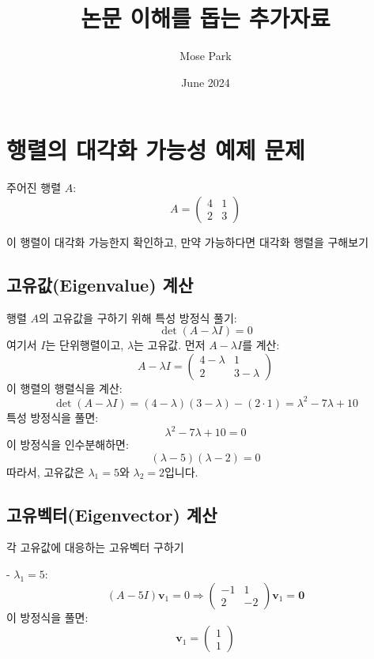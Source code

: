 \documentclass{article}
\title{논문 이해를 돕는 추가자료}
\author{Mose Park}
\date{June 2024}
\begin{document}
\maketitle

\section{행렬의 대각화 가능성 예제 문제}

주어진 행렬 \(A\):
\[
A = \begin{pmatrix}
4 & 1 \\
2 & 3
\end{pmatrix}
\]

이 행렬이 대각화 가능한지 확인하고, 만약 가능하다면 대각화 행렬을 구해보기

\subsection{고유값(Eigenvalue) 계산}


   행렬 \(A\)의 고유값을 구하기 위해 특성 방정식 풀기:
   \[
   \det(A - \lambda I) = 0
   \]
   여기서 \(I\)는 단위행렬이고, \(\lambda\)는 고유값. 먼저 \(A - \lambda I\)를 계산:
   \[
   A - \lambda I = \begin{pmatrix}
   4 - \lambda & 1 \\
   2 & 3 - \lambda
   \end{pmatrix}
   \]
   이 행렬의 행렬식을 계산:
   \[
   \det(A - \lambda I) = (4 - \lambda)(3 - \lambda) - (2 \cdot 1) = \lambda^2 - 7\lambda + 10
   \]
   특성 방정식을 풀면:
   \[
   \lambda^2 - 7\lambda + 10 = 0
   \]
   이 방정식을 인수분해하면:
   \[
   (\lambda - 5)(\lambda - 2) = 0
   \]
   따라서, 고유값은 \(\lambda_1 = 5\)와 \(\lambda_2 = 2\)입니다.

\subsection{고유벡터(Eigenvector) 계산}


   각 고유값에 대응하는 고유벡터 구하기

   - \(\lambda_1 = 5\):
     \[
     (A - 5I) \mathbf{v}_1 = 0 \Rightarrow \begin{pmatrix}
     -1 & 1 \\
     2 & -2
     \end{pmatrix} \mathbf{v}_1 = \mathbf{0}
     \]
     이 방정식을 풀면:
     \[
     \mathbf{v}_1 = \begin{pmatrix} 1 \\ 1 \end{pmatrix}
     \]
\end{document}
